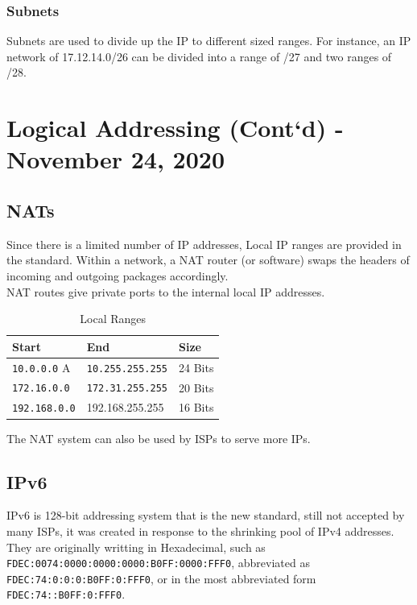 \documentclass[11pt,a4paper,twoside]{book}
\begin{document}
\subsection{Subnets}

Subnets are used to divide up the IP to different sized ranges. For instance, an IP network of 17.12.14.0/26 can be divided into a range of /27 and two ranges of /28.

\chapter{Logical Addressing (Cont`d) - November 24, 2020}

\section{NATs}

Since there is a limited number of IP addresses, Local IP ranges are provided in the standard. Within a network, a NAT router (or software) swaps the headers of incoming and outgoing packages accordingly.\\

NAT routes give private ports to the internal local IP addresses.\\

\newcommand{\C}[1]{\texttt{#1}}

\begin{table}
\begin{tabular}{lll}
\toprule
Start & End & Size \\
\midrule
\C{10.0.0.0} A & \C{10.255.255.255}  & 24 Bits \\
\C{172.16.0.0} & \C{172.31.255.255}& 20 Bits \\ 
\C{192.168.0.0} & 192.168.255.255 & 16 Bits \\
\bottomrule
\end{tabular}
\caption{Local Ranges}
\end{table}

The NAT system can also be used by ISPs to serve more IPs.

\section{IPv6}

IPv6 is 128-bit addressing system that is the new standard, still not accepted by many ISPs, it was created in response to the shrinking pool of IPv4 addresses. They are originally writting in Hexadecimal, such as \C{FDEC:0074:0000:0000:0000:B0FF:0000:FFF0}, abbreviated as \C{FDEC:74:0:0:0:B0FF:0:FFF0}, or in the most abbreviated form \C{FDEC:74::B0FF:0:FFF0}.\\
 
\end{document}

